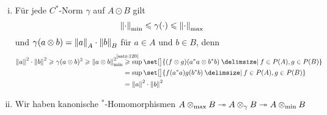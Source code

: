\begin{bemerkung}
    \begin{enumerate}[(i)]
        \item Für jede $C^*$-Norm $\gamma$ auf $A \odot B$ gilt 
        \[
            \norm*{\cdot}_{\min} \le \gamma(\cdot ) \le \norm*{\cdot}_{\max}
        \]
        und $\gamma(a \otimes b) = \norm*{a}_A \cdot \norm*{b}_B$ für $a \in A$ und $b \in B$, denn
        \begin{align}
            \norm*{a}^2 \cdot \norm*{b}^2 \ge \gamma(a \otimes b)^2 \ge \norm*{a \otimes b}_{\min}^2 &\StackTextClap{\ref{satz:120}}{\ge} \sup \set[\big]{(f \otimes g) \enbrace*{a^* a \otimes b^*b} \given f \in P(A), g \in P(B)} \\
            &= \sup \set[\big]{f (a^*a) g(b^*b) \given f \in P(A), g \in P(B)} \\
            &= \norm*{a}^2 \cdot \norm*{b}^2
        \end{align}
        \item Wir haben kanonische $^*$-Homomorphismen 
        $A \tensormax B \twoheadrightarrow A \otimes_\gamma B \twoheadrightarrow A \tensormin B$
    \end{enumerate}
\end{bemerkung}

